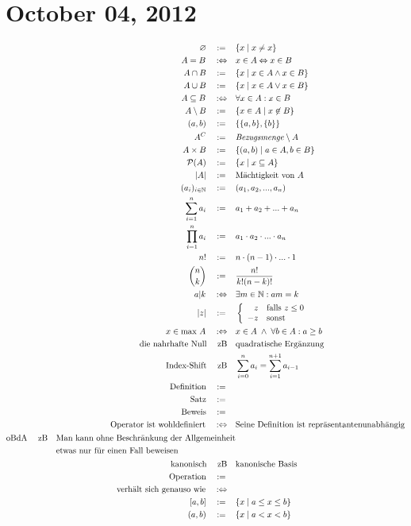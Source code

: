 \documentclass{scrartcl}
\newcommand{\gdw}{\quad :\Leftrightarrow\quad &}
\newcommand{\is}{\quad :=\,\quad &}
\newcommand{\zb}{\quad \;\text{zB}\quad &}
\newcommand{\teilm}{\subseteq}
\newcommand{\NN}{\mathbb{N}}
\newcommand{\s}[1]{\begin{split}#1\end{split}}
\begin{document}
\section{October 04, 2012}
\begin{align*}
  \varnothing \is \{x \mid x \neq x\} \\
  A=B \gdw x \in A \Leftrightarrow x \in B \\
  A \cap B \is \{x \mid x \in A \land x \in B \} \\
  A \cup B \is \{x \mid x \in A \lor x \in B\} \\
  A \teilm B \gdw \forall x \in A: x \in B \\
  A \setminus B \is \{x \in A \mid x \not\in B\} \\
  (a,b) \is \{\{a, b\}, \{b\}\} \\
  A^C \is \text{\emph{Bezugsmenge}} \setminus A \\
  A \times B \is \{(a,b) \mid a \in A, b \in B\} \\
  \mathcal{P}(A) \is \{x \mid x \teilm A\} \\
  |A| \is \text{Mächtigkeit von }A \\
  (a_i)_{i \in \NN} \is (a_1, a_2, ..., a_n) \\
  \sum^{n}_{i=1}{a_i} \is a_1 + a_2 + ... + a_n \\
  \prod^{n}_{i=1}{a_i} \is a_1 \cdot a_2 \cdot ... \cdot a_n \\
  n! \is n \cdot (n-1) \cdot ... \cdot 1 \\
  {n \choose k} \is \frac{n!}{k!(n-k)!} \\
  a|k \gdw \exists m \in \NN : am=k \\
  |z| \is \left\{ \begin{array}{rl} z & \mbox{falls } z \le 0 \\
                                    -z & \mbox{sonst} \end{array} \right. \\
  x \in \text{max } A \gdw x \in A \;\land\; \forall b \in A: a \ge b \\
  \text{die nahrhafte Null} \zb \text{quadratische Ergänzung} \\
  \text{Index-Shift} \zb \sum^{n}_{i=0}{a_i}=\sum^{n+1}_{i=1}{a_{i-1}} \\
  \text{Definition} \is \\
  \text{Satz} \is \\
  \text{Beweis} \is \\
  \text{Operator ist wohldefiniert} \gdw \text{Seine Definition ist
  repräsentantenunabhängig} \\
  \s{\text{oBdA} \zb \text{Man kann ohne Beschränkung der Allgemeinheit} \\
                     & \text{etwas nur für einen Fall beweisen}} \\
  \text{kanonisch} \zb \text{kanonische Basis} \\
  \text{Operation} \is \\
  \text{verhält sich genauso wie} \gdw \\
  [a,b] \is \{x \mid a \le x \le b\} \\
  (a,b) \is \{x \mid a < x < b\}
\end{align*}
\end{document}
